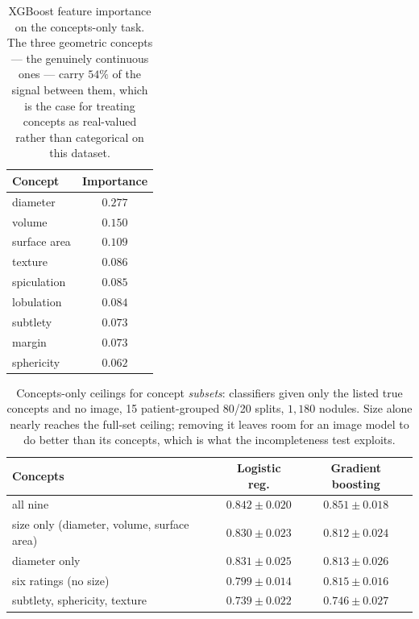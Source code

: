 \documentclass[11pt]{article}
\begin{document}
\begin{table}[h]
\centering
\caption{XGBoost feature importance on the concepts-only task. The three
geometric concepts --- the genuinely continuous ones --- carry $54\%$ of the
signal between them, which is the case for treating concepts as real-valued
rather than categorical on this dataset.}
\label{tab:app-importance}
\begin{tabular}{lc}
\toprule
\textbf{Concept} & \textbf{Importance} \\
\midrule
diameter      & $0.277$ \\
volume        & $0.150$ \\
surface area  & $0.109$ \\
\midrule
texture       & $0.086$ \\
spiculation   & $0.085$ \\
lobulation    & $0.084$ \\
subtlety      & $0.073$ \\
margin        & $0.073$ \\
sphericity    & $0.062$ \\
\bottomrule
\end{tabular}
\end{table}

\begin{table}[h]
\centering
\caption{Concepts-only ceilings for concept \emph{subsets}: classifiers given
only the listed true concepts and no image, 15 patient-grouped 80/20 splits,
$1{,}180$ nodules. Size alone nearly reaches the full-set ceiling; removing it
leaves room for an image model to do better than its concepts, which is what
the incompleteness test exploits.}
\label{tab:app-subsets}
\begin{tabular}{lcc}
\toprule
\textbf{Concepts} & \textbf{Logistic reg.} & \textbf{Gradient boosting} \\
\midrule
all nine                                   & $0.842 \pm 0.020$ & $0.851 \pm 0.018$ \\
size only (diameter, volume, surface area) & $0.830 \pm 0.023$ & $0.812 \pm 0.024$ \\
diameter only                              & $0.831 \pm 0.025$ & $0.813 \pm 0.026$ \\
six ratings (no size)                      & $0.799 \pm 0.014$ & $0.815 \pm 0.016$ \\
subtlety, sphericity, texture              & $0.739 \pm 0.022$ & $0.746 \pm 0.027$ \\
\bottomrule
\end{tabular}
\end{table}
\end{document}
